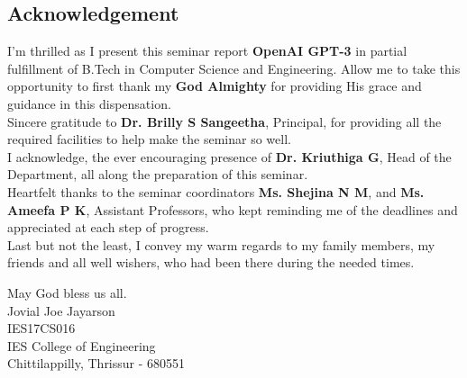 \newpage
\vspace*{\fill}
\begin{center}
    \section*{\huge Acknowledgement}
\end{center}

\noindent I'm thrilled as I present this seminar report \textbf{OpenAI GPT-3} in partial fulfillment of B.Tech in Computer Science and Engineering. Allow me to take this opportunity to first thank my \textbf{God Almighty} for providing His grace and guidance in this dispensation.\\

\noindent Sincere gratitude to \textbf{Dr. Brilly S Sangeetha}, Principal, for providing all the required facilities to help make the seminar so well.\\

\noindent I acknowledge, the ever encouraging presence of \textbf{Dr. Kriuthiga G}, Head of the Department, all along the preparation of this seminar.\\

\noindent Heartfelt thanks to the seminar coordinators \textbf{Ms. Shejina N M}, and \textbf{Ms. Ameefa P K}, Assistant Professors, who kept reminding me of the deadlines and appreciated at each step of progress.\\

\noindent Last but not the least, I convey my warm regards to my family members, my friends and all well wishers, who had been there during the needed times.\\

\begin{center}
    May God bless us all.\\[4cm]
    Jovial Joe Jayarson\\
    IES17CS016\\
    IES College of Engineering\\
    Chittilappilly, Thrissur - 680551
\end{center}
\vspace*{\fill}